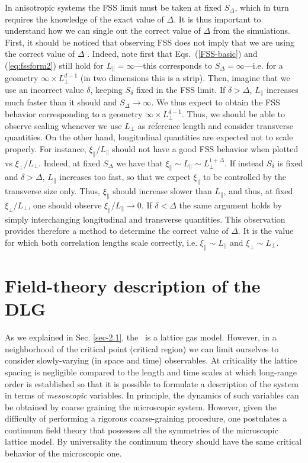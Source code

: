\documentclass[12pt]{article}
\begin{document}
In anisotropic systems the FSS limit must be taken at fixed $S_\Delta$, 
which in turn requires the knowledge of the exact value of $\Delta$. It is 
thus important to understand how we can single out the correct value 
of $\Delta$ from the simulations. First, it should be noticed
that observing FSS does not imply that we are using the correct value of 
$\Delta$ \cite{CGGP-shape}. 
Indeed, note first that Eqs.~(\ref{FSS-basic}) and 
(\ref{eq:fssform2}) still hold for $L_\|=\infty$---this corresponds to 
$S_\Delta=\infty$---i.e. for a geometry 
$\infty\times L_\bot^{d-1}$ (in two dimensions this is a strip). 
Then, imagine that we use an incorrect value $\delta$, keeping $S_\delta$ 
fixed in the FSS limit. If $\delta > \Delta$, $L_\|$ increases 
much faster than it should and $S_\Delta\to\infty$. We thus expect to obtain 
the FSS behavior corresponding to a geometry $\infty\times L_\bot^{d-1}$.
Thus, we should be able to observe scaling whenever we use $L_\bot$ as 
reference length and consider transverse quantities. 
On the other hand, longitudinal quantities are expected not to scale properly.
For instance, $\xi_\|/L_\|$ should not have a good FSS behavior when plotted 
vs $\xi_\bot/L_\bot$. 
Indeed, at fixed $S_\Delta$ we have 
that $\xi_\| \sim L_\| \sim L_\bot^{1 + \Delta}$. If instead $S_\delta$ is 
fixed and $\delta > \Delta$, 
$L_\|$ increases too fast, so that we expect $\xi_\|$ to be controlled
by the transverse size only. Thus, $\xi_\|$ should increase slower than
$L_\|$, and thus, at fixed $\xi_\bot/L_\bot$, one should observe 
$\xi_\|/L_\|\to 0$. If $\delta < \Delta$ the same argument holds by simply
interchanging longitudinal and transverse quantities.
This observation provides therefore a method to determine the 
correct value of $\Delta$. It is the value for which both correlation lengths
scale correctly, i.e. $\xi_\| \sim L_\|$ and $\xi_\bot \sim L_\bot$.

\section{Field-theory description of the DLG} \label{sec-4}

As we explained in Sec. \ref{sec-2.1}, the \dlg\ is a lattice gas
model. However, in a neighborhood of the critical
point (critical region) we can limit ourselves to consider 
slowly-varying (in space and time) observables.
At criticality the lattice spacing is
negligible compared to the length and time scales at which long-range
order is established so that it is possible to formulate a
description of the system in terms of {\it mesoscopic} variables.
In principle, the dynamics of such variables
can be obtained by coarse graining the microscopic system.
However, given the difficulty of performing a rigorous coarse-graining
procedure, one postulates a continuum field theory 
that possesses all the symmetries of the microscopic lattice model. 
By universality the continuum theory should have the same critical behavior 
of the microscopic one. 
\end{document}
